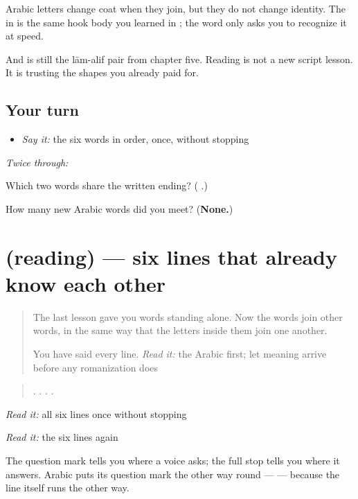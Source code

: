 \begin{cousinweb}
Arabic letters change coat when they join, but they do not change identity. The \textbf{} in \textbf{} is the same hook body you learned in \textbf{}; the word only asks you to recognize it at speed.

And \textbf{} is still the lām-alif pair from chapter five. Reading is not a new script lesson. It is trusting the shapes you already paid for.
\end{cousinweb}

\subsection*{Your turn}
\begin{itemize}
\raggedright
  \item \emph{Say it:} the six words in order, once, without stopping
\end{itemize}

\emph{Twice through:}

\begin{tcolorbox}[breakable,colback=teal!4,colframe=teal!35!black,title={Before you move on}]
Which two words share the written \textbf{} ending? (\textbf{ }.)

How many new Arabic words did you meet? (\textbf{None.})
\end{tcolorbox}
\section[(reading)]{(reading) — six lines that already know each other}

\label{lesson:AR-C42-lines}



\begin{quote}
The last lesson gave you words standing alone. Now the words join other words, in the same way that the letters inside them join one another.

You have said every line. \emph{Read it:} the Arabic first; let meaning arrive before any romanization does
\end{quote}

\begin{tcolorbox}[breakable,skin=enhanced,colback=orange!6,colframe=orange!45!black,boxrule=0.5pt,arc=1mm,left=6pt,right=6pt,top=4pt,bottom=4pt,fonttitle=\bfseries,title={Read this}]
\begin{quote}
 .  .    .    .
\end{quote}

\emph{Read it:} all six lines once without stopping

\emph{Read it:} the six lines again

The question mark tells you where a voice asks; the full stop tells you where it answers. Arabic puts its question mark the other way round — \textbf{} — because the line itself runs the other way.
\end{tcolorbox}

